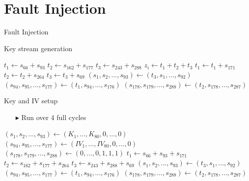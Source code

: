 \documentclass[10pt, compress]{beamer}
\begin{document}
\section{Fault Injection}

\begin{frame}{Fault Injection}
\begin{figure}

\end{figure}
\end{frame}

\begin{frame}{Key stream generation}
\begin{center}
\begin{minipage}{\textwidth}
\begin{algorithm}[H]
\begin{algorithmic}[1]
 
\State $t_1 \gets s_{66} + s_{93}$
\State $t_2 \gets s_{162} + s_{177}$
\State $t_3 \gets s_{243} + s_{288}$
\State
\State $z_i \gets t_1 + t_2 + t_3$
\State
\State $t_1 \gets t_1 + s_{171}$
\State $t_2 \gets t_2 + s_{264}$
\State $t_3 \gets t_3 + s_{69}$
\State
\State $(s_1,s_2,...,s_{93}) \gets (t_3,s_1,...,s_{92})$ 
\State $(s_{94},s_{95},...,s_{177}) \gets (t_1,s_{94},...,s_{176})$ 
\State $(s_{178},s_{179},...,s_{288}) \gets (t_2,s_{178},...,s_{287})$ 
\EndFor
\end{algorithmic}
\end{algorithm}
\end{minipage}
\end{center}
\end{frame}

\begin{frame}{Key and IV setup}
\begin{itemize}
\item[$\blacktriangleright$] Run over 4 full cycles 
\end{itemize}
\begin{center}
\begin{minipage}{\textwidth}
\begin{algorithm}[H]
\begin{algorithmic}[1]
\State $(s_1,s_2,...,s_{93}) \gets (K_1,...,K_{80},0,...,0)$ 
\State $(s_{94},s_{95},...,s_{177}) \gets (IV_1,...,IV_{80},0,...,0)$ 
\State $(s_{178},s_{179},...,s_{288}) \gets (0,...,0,1,1,1)$ 
\State
{}
\State $t_1 \gets s_{66} + s_{93} + s_{171}$
\State $t_2 \gets s_{162} + s_{177} + s_{264}$
\State $t_3 \gets s_{243} + s_{288}+ s_{69}$
\State
\State $(s_1,s_2,...,s_{93}) \gets (t_3,s_1,...,s_{92})$ 
\State $(s_{94},s_{95},...,s_{177}) \gets (t_1,s_{94},...,s_{176})$ 
\State $(s_{178},s_{179},...,s_{288}) \gets (t_2,s_{178},...,s_{287})$ 
\EndFor
\end{algorithmic}
\end{algorithm}
\end{minipage}
\end{center}
\end{frame}
\end{document}
